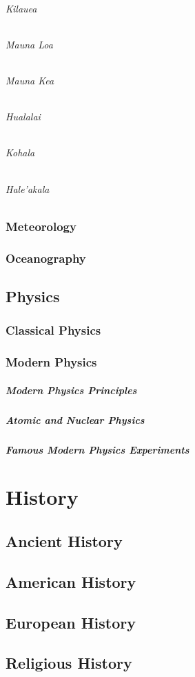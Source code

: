 \documentclass{book}
\begin{document}
				\subparagraph{Kilauea}
				\subparagraph{Mauna Loa}
				\subparagraph{Mauna Kea}
				\subparagraph{Hualalai}
				\subparagraph{Kohala}
				\subparagraph{Hale'akala}
			
		\subsection{Meteorology}
		\subsection{Oceanography}
	\section{Physics}
		\subsection{Classical Physics}
		\subsection{Modern Physics}
			\paragraph{Modern Physics Principles}
			\paragraph{Atomic and Nuclear Physics}
			\paragraph{Famous Modern Physics Experiments}
			
		


\chapter{History}
	\section{Ancient History}
	\section{American History}
	\section{European History}
	\section{Religious History}
\end{document}
